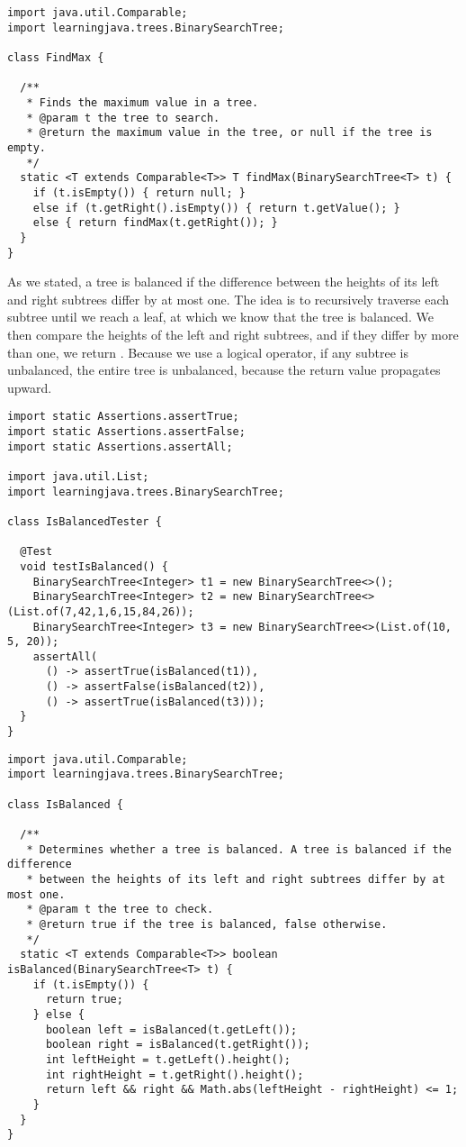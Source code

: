 \begin{lstlisting}[language=MyJava]
import java.util.Comparable;
import learningjava.trees.BinarySearchTree;

class FindMax {

  /**
   * Finds the maximum value in a tree.
   * @param t the tree to search.
   * @return the maximum value in the tree, or null if the tree is empty.
   */
  static <T extends Comparable<T>> T findMax(BinarySearchTree<T> t) {
    if (t.isEmpty()) { return null; } 
    else if (t.getRight().isEmpty()) { return t.getValue(); } 
    else { return findMax(t.getRight()); }
  }
}
\end{lstlisting}

 As we stated, a tree is balanced if the difference between the heights of its left and right subtrees differ by at most one. The idea is to recursively traverse each subtree until we reach a leaf, at which we know that the tree is balanced. We then compare the heights of the left and right subtrees, and if they differ by more than one, we return . Because we use a logical  operator, if any subtree is unbalanced, the entire tree is unbalanced, because the  return value propagates upward.

\begin{lstlisting}[language=MyJava]
import static Assertions.assertTrue;
import static Assertions.assertFalse;
import static Assertions.assertAll;

import java.util.List;
import learningjava.trees.BinarySearchTree;

class IsBalancedTester {

  @Test
  void testIsBalanced() {
    BinarySearchTree<Integer> t1 = new BinarySearchTree<>();
    BinarySearchTree<Integer> t2 = new BinarySearchTree<>(List.of(7,42,1,6,15,84,26));
    BinarySearchTree<Integer> t3 = new BinarySearchTree<>(List.of(10, 5, 20));
    assertAll(
      () -> assertTrue(isBalanced(t1)),
      () -> assertFalse(isBalanced(t2)),
      () -> assertTrue(isBalanced(t3)));
  }
}
\end{lstlisting}

\begin{lstlisting}[language=MyJava]
import java.util.Comparable;
import learningjava.trees.BinarySearchTree;

class IsBalanced {

  /**
   * Determines whether a tree is balanced. A tree is balanced if the difference 
   * between the heights of its left and right subtrees differ by at most one.
   * @param t the tree to check.
   * @return true if the tree is balanced, false otherwise.
   */
  static <T extends Comparable<T>> boolean isBalanced(BinarySearchTree<T> t) {
    if (t.isEmpty()) {
      return true;
    } else {
      boolean left = isBalanced(t.getLeft());
      boolean right = isBalanced(t.getRight());
      int leftHeight = t.getLeft().height();
      int rightHeight = t.getRight().height();
      return left && right && Math.abs(leftHeight - rightHeight) <= 1;
    }
  }
}
\end{lstlisting}

